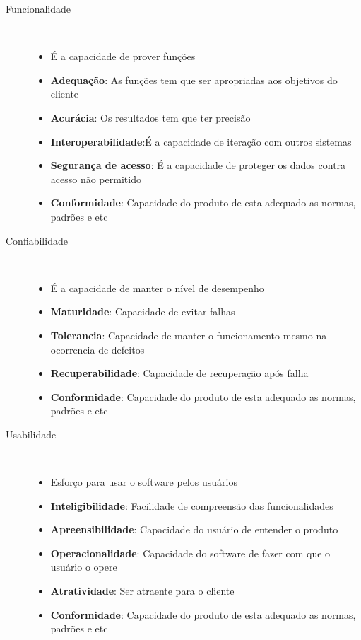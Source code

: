   \begin{description}
    \item[Funcionalidade] \
      \begin{itemize}
        \item É a capacidade de prover funções
        \item \textbf{Adequação}: As funções tem que ser apropriadas aos objetivos do cliente
        \item \textbf{Acurácia}: Os resultados tem que ter precisão
        \item \textbf{Interoperabilidade}:É a capacidade de iteração com outros sistemas
        \item \textbf{Segurança de acesso}: É a capacidade de proteger os dados contra acesso não permitido
        \item \textbf{Conformidade}: Capacidade do produto de esta adequado as normas, padrões e etc
      \end{itemize}
    \item[Confiabilidade] \
      \begin{itemize}
        \item É a capacidade de manter o nível de desempenho
        \item \textbf{Maturidade}: Capacidade de evitar falhas
        \item \textbf{Tolerancia}: Capacidade de manter o funcionamento mesmo na ocorrencia de defeitos
        \item \textbf{Recuperabilidade}: Capacidade de recuperação após falha
        \item \textbf{Conformidade}: Capacidade do produto de esta adequado as normas, padrões e etc
      \end{itemize}
    \item[Usabilidade] \
      \begin{itemize}
        \item Esforço para usar o software pelos usuários
        \item \textbf{Inteligibilidade}: Facilidade de compreensão das funcionalidades
        \item \textbf{Apreensibilidade}: Capacidade do usuário de entender o produto
        \item \textbf{Operacionalidade}: Capacidade do software de fazer com que o usuário o opere
        \item \textbf{Atratividade}: Ser atraente para o cliente
        \item \textbf{Conformidade}: Capacidade do produto de esta adequado as normas, padrões e etc

\end{itemize}
\end{description}
